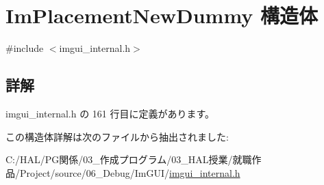 \hypertarget{struct_im_placement_new_dummy}{}\section{Im\+Placement\+New\+Dummy 構造体}
\label{struct_im_placement_new_dummy}


{\ttfamily \#include $<$imgui\+\_\+internal.\+h$>$}



\subsection{詳解}


 imgui\+\_\+internal.\+h の 161 行目に定義があります。



この構造体詳解は次のファイルから抽出されました\+:\begin{DoxyCompactItemize}
\item 
C\+:/\+H\+A\+L/\+P\+G関係/03\+\_\+作成プログラム/03\+\_\+\+H\+A\+L授業/就職作品/\+Project/source/06\+\_\+\+Debug/\+Im\+G\+U\+I/\mbox{\hyperlink{imgui__internal_8h}{imgui\+\_\+internal.\+h}}\end{DoxyCompactItemize}
